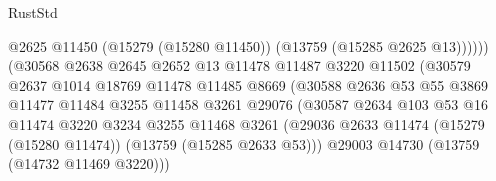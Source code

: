 \begin{lexlean}{RustStd}
\begin{coremodule}
                                              @2625
                                              @11450
                                              (@15279 (@15280 @11450))
                                              (@13759 (@15285 @2625 @13))))))
                                      (@30568
                                        @2638
                                        @2645
                                        @2652
                                        @13
                                        @11478
                                        @11487
                                        @3220
                                        @11502
                                        (@30579
                                          @2637
                                          @1014
                                          @18769
                                          @11478
                                          @11485
                                          @8669
                                          (@30588
                                            @2636
                                            @53
                                            @55
                                            @3869
                                            @11477
                                            @11484
                                            @3255
                                            @11458
                                            @3261
                                            @29076
                                            (@30587
                                              @2634
                                              @103
                                              @53
                                              @16
                                              @11474
                                              @3220
                                              @3234
                                              @3255
                                              @11468
                                              @3261
                                              (@29036
                                                @2633
                                                @11474
                                                (@15279 (@15280 @11474))
                                                (@13759 (@15285 @2633 @53)))
                                              @29003
                                              @14730
                                              (@13759 (@14732 @11469 @3220)))

\end{coremodule}
\end{lexlean}
